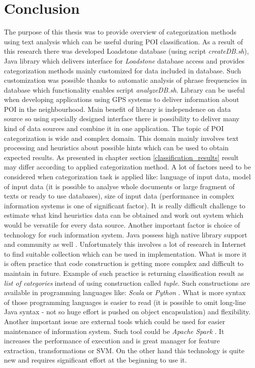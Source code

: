 \section{Conclusion}
The purpose of this thesis was to provide overview of categorization methods using text analysis which can be useful during POI classification. As a result of this research there was developed Loadstone database (using script \textit{createDB.sh}), Java library which delivers interface for \textit{Loadstone} database access and provides categorization methods mainly customized for data included in database. Such customization was possible thanks to automatic analysis of phrase frequencies in database which functionality enables script \textit{analyzeDB.sh}. Library can be useful when developing applications using GPS systems to deliver information about POI in the neighbourhood. Main benefit of library is independence on data source so using specially designed interface there is possibility to deliver many kind of data sources and combine it in one application. The topic of POI categorization is wide and complex domain. This domain mainly involves text processing and heuristics about possible hints which can be used to obtain expected results. As presented in chapter section \ref{classification_results} result may differ according to applied categorization method. A lot of factors need to be considered when categorization task is applied like: language of input data, model of input data (it is possible to analyse whole documents or large fragment of texts or ready to use databases), size of input data (performance in complex information systems is one of significant factor). It is really difficult challenge to estimate what kind heuristics data can be obtained and work out system which would be versatile for every data source. Another important factor is choice of technology for such information system. Java possess high native library support and community as well \cite{24}\cite{25}. Unfortunately this involves a lot of research in Internet to find suitable collection which can be used in implementation. What is more it is often practice that code construction is getting more complex and difficult to maintain in future. Example of such practice is returning classification result as \textit{list of categories} instead of using construction called \textit{tuple}. Such constructions are available in programming languages like: \textit{Scala} \cite{26} or \textit{Python} \cite{27}. What is more syntax of those programming languages is easier to read (it is possible to omit long-line Java syntax - not so huge effort is pushed on object encapsulation) and flexibility. Another important issue are external tools which could be used for easier maintenance of information system. Such tool could be \textit{Apache Spark} \cite{28}. It increases the performance of execution and is great manager for feature extraction, transformations or SVM. On the other hand this technology is quite new and requires significant effort at the beginning to use it.     